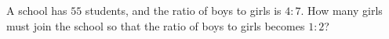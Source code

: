 A school has $55$ students, and the ratio of boys to girls is $4:7$. How many girls must join the school so that the ratio of boys to girls becomes $1:2$?
